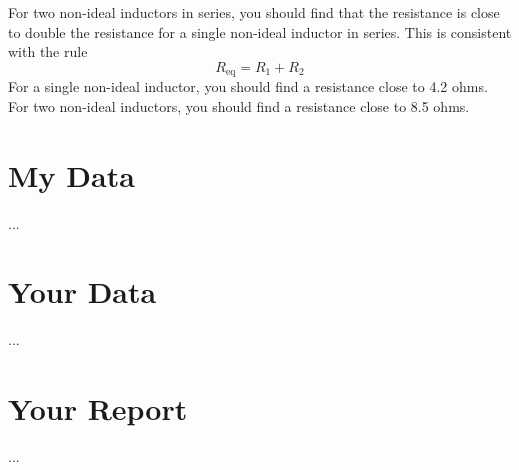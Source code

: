 For two non-ideal inductors in series, you should find that the resistance is close to double the resistance for a single non-ideal inductor in series. This is consistent with the rule
\begin{equation}
    R_{\text{eq}} = R_{1} + R_{2}
\end{equation}
For a single non-ideal inductor, you should find a resistance close to 4.2 ohms. For two non-ideal inductors, you should find a resistance close to 8.5 ohms.
%
\section{My Data}
%
...
%
\section{Your Data}
%
...
%
\newpage
\section{Your Report}
%
...
%
\newpage
